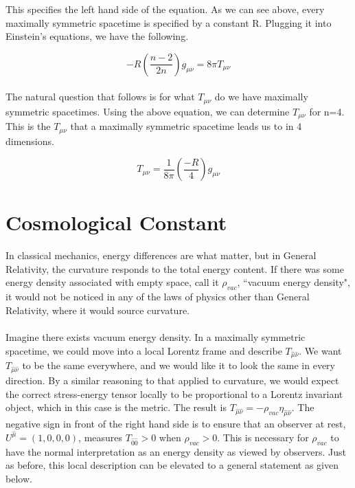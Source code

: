 \documentclass[10pt]{article}
\begin{document}
    This specifies the left hand side of the equation. As we can see above, every maximally symmetric spacetime is specified by a constant R. Plugging it into Einstein's equations, we have the following.
    
     \begin{equation}
         -R(\frac{n-2}{2n}){g}_{\mu\nu} = 8 \pi {T}_{\mu\nu}
    \end{equation}
    
    \paragraph{}The natural question that follows is for what ${T}_{\mu\nu}$ do we have maximally symmetric spacetimes. Using the above equation, we can determine ${T}_{\mu\nu}$ for n=4. This is the ${T}_{\mu\nu}$ that a maximally symmetric spacetime leads us to in 4 dimensions. 
    
    \begin{equation}
         {T}_{\mu\nu} = \frac{1}{8\pi}(\frac{-R}{4}){g}_{\mu\nu}
    \end{equation}
     
     \section{Cosmological Constant} 
     
     \paragraph{}In classical mechanics, energy differences are what matter, but in General Relativity, the curvature responds to the total energy content. If there was some energy density associated with empty space, call it ${\rho}_{vac}$, ``vacuum energy density", it would not be noticed in any of the laws of physics other than General Relativity, where it would source curvature. 
     
     \paragraph{} Imagine there exists vacuum energy density. In a maximally symmetric spacetime, we could move into a local Lorentz frame and describe ${T}_{\hat{\mu}\hat{\nu}}$. We want ${T}_{\hat{\mu}\hat{\nu}}$ to be the same everywhere, and we would like it to look the same in every direction. By a similar reasoning to that applied to curvature, we would expect the correct stress-energy tensor locally to be proportional to a Lorentz invariant object, which in this case is the metric. The result is ${T}_{\hat{\mu}\hat{\nu}} = -{\rho}_{vac}{\eta}_{\hat{\mu}\hat{\nu}}$. The negative sign in front of the right hand side is to ensure that an observer at rest, ${U}^{\hat{\mu}} = (1,0,0,0)$, measures ${T}_{\hat{0}\hat{0}} > 0$ when ${\rho}_{vac}>0$. This is necessary for ${\rho}_{vac}$ to have the normal interpretation as an energy density as viewed by observers. Just as before, this local description can be elevated to a general statement as given below.
     
\end{document}
